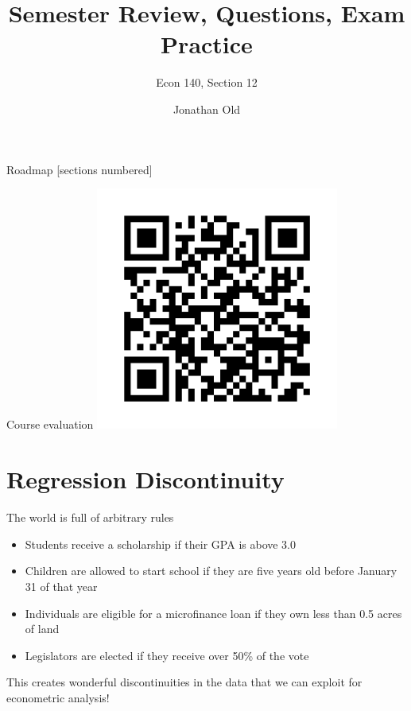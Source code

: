 \documentclass[11pt,xcolor=table]{beamer}
\title{Semester Review, Questions, Exam Practice
}
\subtitle{Econ 140, Section 12}
\date{}
\author{Jonathan Old}
\begin{document}
\maketitle

\begin{frame}{Roadmap}
  [sections numbered]
  \tableofcontents%
\end{frame}





\begin{frame}{Course evaluation}
\centering
\includegraphics[width=0.6\textwidth]{figures/course_eval_qr.png}

   
\end{frame}



\section{Regression Discontinuity}



\begin{frame}{The world is full of arbitrary rules}
\begin{itemize}
    \item Students receive a scholarship if their GPA is above 3.0
    \item Children are allowed to start school if they are five years old before January 31 of that year
    \item Individuals are eligible for a microfinance loan if they own less than 0.5 acres of land
    \item Legislators are elected if they receive over 50\% of the vote
\end{itemize}

\alert{This creates wonderful discontinuities in the data that we can exploit for econometric analysis!} 

   
\end{frame}
\end{document}
